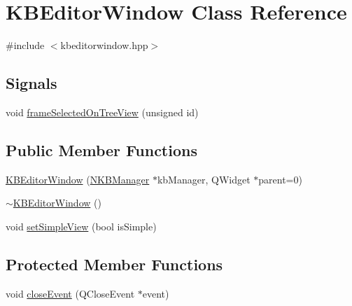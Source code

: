 \hypertarget{class_k_b_editor_window}{
\section{KBEditorWindow Class Reference}
\label{class_k_b_editor_window}
}


{\ttfamily \#include $<$kbeditorwindow.hpp$>$}

\subsection*{Signals}
\begin{DoxyCompactItemize}
\item 
void \hyperlink{class_k_b_editor_window_a97754111c22d2b53cdd4a103db9f54c1}{frameSelectedOnTreeView} (unsigned id)
\end{DoxyCompactItemize}
\subsection*{Public Member Functions}
\begin{DoxyCompactItemize}
\item 
\hyperlink{class_k_b_editor_window_a59c92ee4fda5a49dba23ee769e612925}{KBEditorWindow} (\hyperlink{class_n_k_b_manager}{NKBManager} $\ast$kbManager, QWidget $\ast$parent=0)
\item 
\hyperlink{class_k_b_editor_window_ad0bd096b4fd6c32ede9d06ee59e1ba5c}{$\sim$KBEditorWindow} ()
\item 
void \hyperlink{class_k_b_editor_window_ad47887ff64e7cb384b78d2e5599ffe38}{setSimpleView} (bool isSimple)
\end{DoxyCompactItemize}
\subsection*{Protected Member Functions}
\begin{DoxyCompactItemize}
\item 
void \hyperlink{class_k_b_editor_window_adf083c6d9382cb07a33169a919e289df}{closeEvent} (QCloseEvent $\ast$event)
\end{DoxyCompactItemize}


